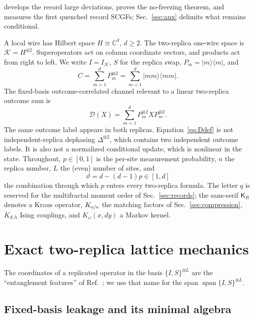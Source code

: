 \documentclass[aps,prx,reprint,superscriptaddress,nobibnotes,longbibliography]{revtex4-2}
\theoremstyle{remark}
\newcommand{\cK}{\mathcal K}
\newcommand{\vth}{\vartheta}
\begin{document}
develops the record large deviations, proves the no-freezing theorem, and measures the first quenched record SCGFs; Sec.~\ref{sec:aux} delimits what remains conditional.

A local wire has Hilbert space $H\cong\mathbb C^d$, $d\ge2$.  The two-replica one-wire space is $\cK=H^{\otimes2}$.  Superoperators act on column coordinate vectors, and products act from right to left.  We write $I=I_{\cK}$, $S$ for the replica swap, $P_m=|m\rangle\langle m|$, and
\begin{equation}
 C=\sum_{m=1}^d P_m^{\otimes2}=\sum_{m=1}^d|mm\rangle\langle mm|.
 \label{eq:Cdef}
\end{equation}
The fixed-basis outcome-correlated channel relevant to a linear two-replica outcome sum is
\begin{equation}
 \mathcal D(X)=\sum_{m=1}^dP_m^{\otimes2}X P_m^{\otimes2}.
 \label{eq:Ddef}
\end{equation}
The same outcome label appears in both replicas.  Equation~\eqref{eq:Ddef} is not independent-replica dephasing $\Delta^{\otimes2}$, which contains two independent outcome labels.  It is also not a normalized conditional update, which is nonlinear in the state.  Throughout, $p\in[0,1]$ is the per-site measurement probability, $n$ the replica number, $L$ the (even) number of sites, and
\begin{equation}
 \vth=d-(d-1)p\in[1,d]
 \label{eq:vth}
\end{equation}
the combination through which $p$ enters every two-replica formula.  The letter $q$ is reserved for the multifractal moment order of Sec.~\ref{sec:records}; the sans-serif $\mathsf K_R$ denotes a Kraus operator, $K_{\rm o/e}$ the matching factors of Sec.~\ref{sec:compression}, $K_{d,h}$ Ising couplings, and $K_\omega(x,dy)$ a Markov kernel.

\section{Exact two-replica lattice mechanics}

The coordinates of a replicated operator in the basis $\{I,S\}^{\otimes L}$ are the ``entanglement features'' of Ref.~\cite{Kuo2020}; we use that name for the span $\operatorname{span}\{I,S\}^{\otimes L}$.

\subsection{Fixed-basis leakage and its minimal algebra}
\end{document}
